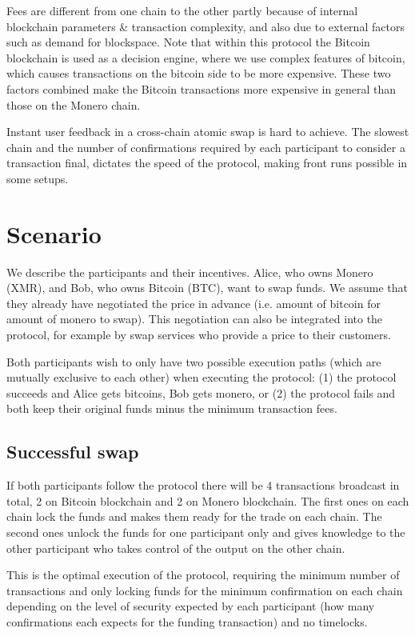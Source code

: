 \documentclass{llncs}
\begin{document}
Fees are different from one chain to the other partly because of internal blockchain parameters & transaction complexity, and also due to external factors such as demand for blockspace. Note that within this protocol the Bitcoin blockchain is used as a decision engine, where we use complex features of bitcoin, which causes transactions on the bitcoin side to be more expensive. These two factors combined make the Bitcoin transactions more expensive in general than those on the Monero chain.

Instant user feedback in a cross-chain atomic swap is hard to achieve.  The slowest chain and the number of confirmations required by each participant to consider a transaction final, dictates the speed of the protocol, making front runs possible in some setups.

\section{Scenario}
We describe the participants and their incentives. Alice, who owns Monero (XMR), and Bob, who owns Bitcoin (BTC), want to swap funds. We assume that they already have negotiated the price in advance (i.e. amount of bitcoin for amount of monero to swap). This negotiation can also be integrated into the protocol, for example by swap services who provide a price to their customers.

Both participants wish to only have two possible execution paths (which are mutually exclusive to each other) when executing the protocol: (1) the protocol succeeds and Alice gets bitcoins, Bob gets monero, or (2) the protocol fails and both keep their original funds minus the minimum transaction fees.

\subsection{Successful swap}
If both participants follow the protocol there will be 4 transactions broadcast in total, 2 on Bitcoin blockchain and 2 on Monero blockchain. The first ones on each chain lock the funds and makes them ready for the trade on each chain. The second ones unlock the funds for one participant only and gives knowledge to the other participant who takes control of the output on the other chain.

This is the optimal execution of the protocol, requiring the minimum number of transactions and only locking funds for the minimum confirmation on each chain depending on the level of security expected by each participant (how many confirmations each expects for the funding transaction) and no timelocks.
\end{document}
